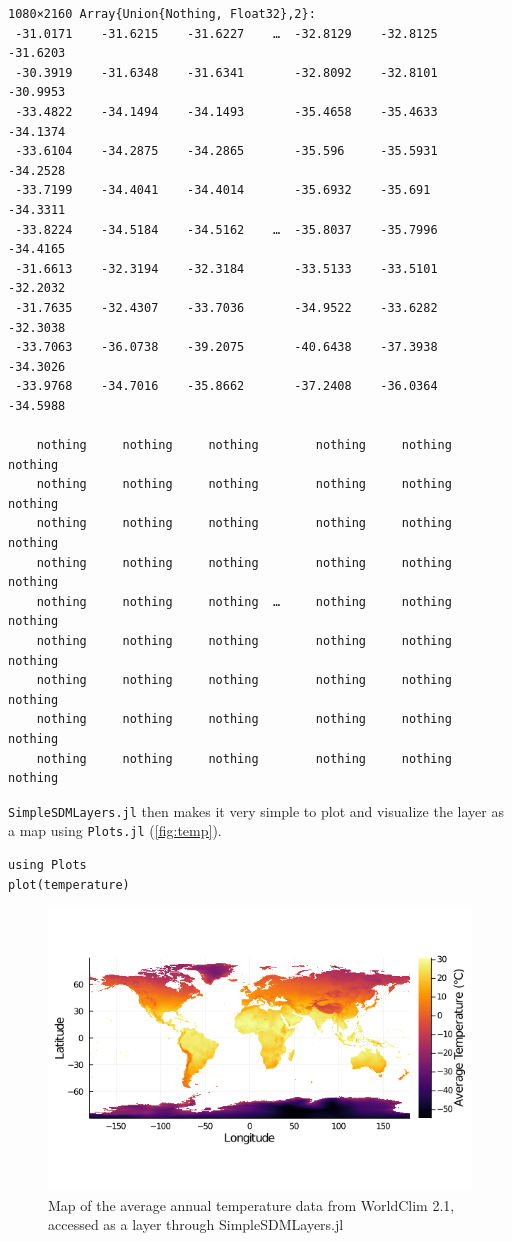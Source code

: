 \documentclass[
]{article}
\begin{document}
\begin{verbatim}
1080×2160 Array{Union{Nothing, Float32},2}:
 -31.0171    -31.6215    -31.6227    …  -32.8129    -32.8125    -31.6203
 -30.3919    -31.6348    -31.6341       -32.8092    -32.8101    -30.9953
 -33.4822    -34.1494    -34.1493       -35.4658    -35.4633    -34.1374
 -33.6104    -34.2875    -34.2865       -35.596     -35.5931    -34.2528
 -33.7199    -34.4041    -34.4014       -35.6932    -35.691     -34.3311
 -33.8224    -34.5184    -34.5162    …  -35.8037    -35.7996    -34.4165
 -31.6613    -32.3194    -32.3184       -33.5133    -33.5101    -32.2032
 -31.7635    -32.4307    -33.7036       -34.9522    -33.6282    -32.3038
 -33.7063    -36.0738    -39.2075       -40.6438    -37.3938    -34.3026
 -33.9768    -34.7016    -35.8662       -37.2408    -36.0364    -34.5988
                                                                
    nothing     nothing     nothing        nothing     nothing     nothing
    nothing     nothing     nothing        nothing     nothing     nothing
    nothing     nothing     nothing        nothing     nothing     nothing
    nothing     nothing     nothing        nothing     nothing     nothing
    nothing     nothing     nothing  …     nothing     nothing     nothing
    nothing     nothing     nothing        nothing     nothing     nothing
    nothing     nothing     nothing        nothing     nothing     nothing
    nothing     nothing     nothing        nothing     nothing     nothing
    nothing     nothing     nothing        nothing     nothing     nothing
\end{verbatim}

\texttt{SimpleSDMLayers.jl} then makes it very simple to
plot and visualize the layer as a map using
\texttt{Plots.jl} (\autoref{fig:temp}).

\begin{verbatim}
using Plots
plot(temperature)
\end{verbatim}

\begin{figure}
\centering
\includegraphics{figures/joss/paper_temp_1.png}
\caption{Map of the average annual temperature data from WorldClim 2.1,
accessed as a layer through SimpleSDMLayers.jl\label{fig:temp}}
\end{figure}
\end{document}
